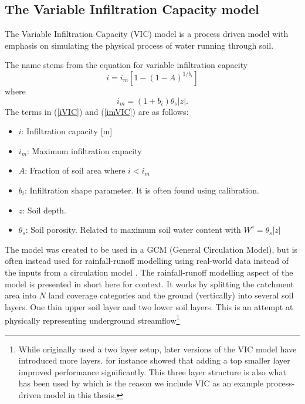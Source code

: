 \subsection{The Variable Infiltration Capacity model}
\label{VIC}
The Variable Infiltration Capacity (VIC) model \citep{VIC} is a process driven model 
with emphasis on simulating the physical process of water running through soil.

The name stems from the equation for variable infiltration capacity
\begin{equation}
    i = i_m \left[ 1 - (1-A)^{1/b_i}  \right] \label{iVIC}
\end{equation}
where
\begin{equation}
    i_m = (1+b_i)\theta_s|z|.  \label{imVIC}
\end{equation} \citep{VIC2L}
The terms in (\ref{iVIC}) and (\ref{imVIC}) are as follows:
\begin{itemize}
    \item $i$: Infiltration capacity [m]
    \item $i_m$: Maximum infiltration capacity
    \item $A$: Fraction of soil area where $i < i_m$
    \item $b_i$: Infiltration shape parameter. It is often found using calibration.
    \item $z$: Soil depth.
    \item $\theta_s$: Soil porosity. Related to maximum soil water content with $W^c = \theta_s |z|$
\end{itemize}


The model was created to be used in a GCM (General Circulation Model), but is often 
instead used for rainfall-runoff modelling using real-world data instead of the inputs 
from a circulation model \citationneeded. The rainfall-runoff modelling aspect 
of the model is presented in short here for context. It works by splitting the catchment 
area into $N$ land coverage categories and the ground (vertically) into several soil layers. 
One thin  upper soil layer and two lower soil layers. This is an attempt at physically 
representing underground streamflow\footnote{While \citet{VIC} originally used a 
two layer setup, later versions of the VIC model have introduced more layers. 
\citet{VIC2L} for instance showed that adding a top smaller layer improved performance 
significantly. This three layer structure is also what has been used by \citet{VICbench} 
which is the reason we include VIC as an example process-driven model in this thesis.}

